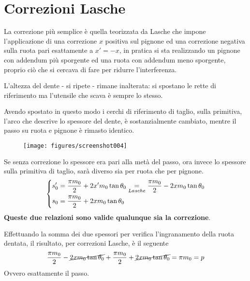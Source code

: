 \documentclass[a4paper, 15pt]{article}
\begin{document}
\section{Correzioni Lasche}
\begin{adjustwidth}{2in}{}				
				La correzione più semplice è quella teorizzata da Lasche che impone l'applicazione di una correzione $x$ positiva sul pignone  ed una correzione negativa sulla ruota pari esattamente a $x' = -x$, in pratica si sta realizzando un pignone con addendum più sporgente ed una ruota con addendum meno sporgente, proprio ciò che si cercava di fare per ridurre l'interferenza. 
				
				L'altezza del dente - si ripete - rimane inalterata: si spostano le rette di riferimento ma l'utensile che scava è sempre lo stesso. \newline 
				
				Avendo spostato in questo modo i cerchi di riferimento di taglio, sulla primitiva, l'arco che descrive lo spessore del dente, è sostanzialmente cambiato, mentre il passo su ruota e pignone è rimasto identico. 
				\begin{figure}[H]
					\centering
					\texttt{[image: figures/screenshot004]}
					\label{fig:screenshot004}
				\end{figure}
				
				Se senza correzione lo spessore era pari alla metà del passo, ora invece lo spessore sulla primitiva di taglio, sarà diverso sia per ruota che per pignone. 
				\[\begin{dcases}
					s_0' = \dfrac{\pi m_0}{2} + 2x'm_0\tan\theta_0 \underset{Lasche}{=} \dfrac{\pi m_0}{2} - 2xm_0\tan\theta_0 \\
					s_0 = \dfrac{\pi m_0}{2} + 2xm_0\tan\theta_0
				\end{dcases}\]
				\textbf{Queste due relazioni sono valide qualunque sia la correzione}. 
				
				Effettuando la somma dei due spessori per verifica l'ingranamento della ruota dentata, il risultato, per correzioni Lasche, è il seguente
				\[\dfrac{\pi m_0}{2} - \cancel{2xm_0\tan\theta_0} + \dfrac{\pi m_0}{2} + \cancel{2xm_0\tan\theta_0} = \pi m_0 = p\]
				Ovvero esattamente il passo. 
				

\end{adjustwidth}
\end{document}
